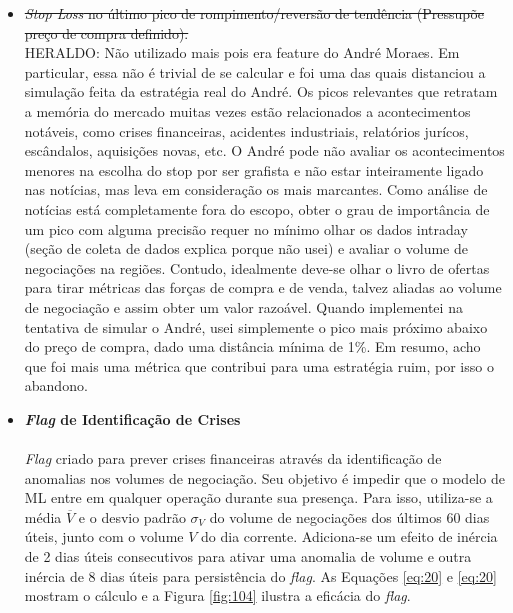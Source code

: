 \begin{itemize}
    \item \sout{\textit{Stop Loss} no último pico de rompimento/reversão de tendência (Pressupõe preço de compra definido).} \\
    \color{red} HERALDO: Não utilizado mais pois era feature do André Moraes. Em particular, essa não é trivial de se calcular e foi uma das quais distanciou a simulação feita da estratégia real do André. Os picos relevantes que retratam a memória do mercado muitas vezes estão relacionados a acontecimentos notáveis, como crises financeiras, acidentes industriais, relatórios jurícos, escândalos, aquisições novas, etc. O André pode não avaliar os acontecimentos menores na escolha do stop por ser grafista e não estar inteiramente ligado nas notícias, mas leva em consideração os mais marcantes. Como análise de notícias está completamente fora do escopo, obter o grau de importância de um pico com alguma precisão requer no mínimo olhar os dados intraday (seção de coleta de dados explica porque não usei) e avaliar o volume de negociações na regiões. Contudo, idealmente deve-se olhar o livro de ofertas para tirar métricas das forças de compra e de venda, talvez aliadas ao volume de negociação e assim obter um valor razoável. Quando implementei na tentativa de simular o André, usei simplemente o pico mais próximo abaixo do preço de compra, dado uma distância mínima de 1\%. Em resumo, acho que foi mais uma métrica que contribui para uma estratégia ruim, por isso o abandono. 

    \item \textbf{\textit{Flag} de Identificação de Crises} \\ \\
        \textit{Flag} criado para prever crises financeiras através da identificação de anomalias nos volumes de negociação. Seu objetivo é impedir que o modelo de ML entre em qualquer operação durante sua presença. Para isso, utiliza-se a média \begin{math} \overline{V} \end{math} e o desvio padrão \begin{math} \sigma_V \end{math} do volume de negociações dos últimos 60 dias úteis, junto com o volume \begin{math} V \end{math} do dia corrente. Adiciona-se um efeito de inércia de 2 dias úteis consecutivos para ativar uma anomalia de volume e outra inércia de 8 dias úteis para persistência do \textit{flag}. As Equações \ref{eq:20} e \ref{eq:20} mostram o cálculo e a Figura \ref{fig:104} ilustra a eficácia do \textit{flag}.


\end{itemize}
